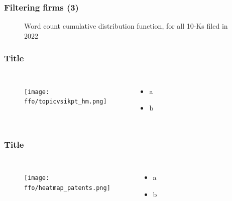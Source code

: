 \documentclass{beamer}
\newcommand{\ffo}{dicfullmc10thr10defnob40noa1_4t}
\begin{document}
\begin{frame}
\frametitle{Filtering firms (3)}
\label{min_words}
\begin{figure}
  \centering
  \hfill
  \caption{Word count cumulative distribution function, for all 10-Ks filed in 2022}
  \label{fig:cdf}
\end{figure}
\end{frame}

\begin{frame}
\frametitle{Title}
       \begin{columns}
             \begin{figure}[h!]
		  \centering
		  \texttt{[image: \\ffo/topicvsikpt\_hm.png]}
		  \centering
		  \captionsetup{font=scriptsize}
		  \label{fig:topicvsikpt_hm}
			\end{figure}
          \scriptsize
              \begin{itemize}
			  \item a
			  \item b
			\end{itemize}
	  \end{columns} 
\end{frame}

\begin{frame}
\frametitle{Title}
       \begin{columns}
             \begin{figure}[h!]
		  \centering
		  \texttt{[image: \\ffo/heatmap\_patents.png]}
		  \captionsetup{font=scriptsize}
		  \label{fig:heatmappatents}
			\end{figure}
          \scriptsize
              \begin{itemize}
			  \item a
			  \item b
			\end{itemize}
	  \end{columns} 
\end{frame}
\end{document}
